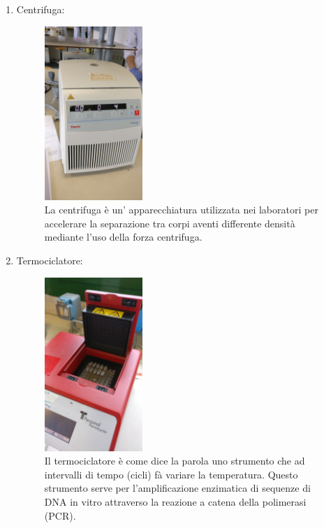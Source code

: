 \documentclass{article}
\begin{document}
\begin{enumerate}
		\vspace{0.5cm}


		\item Centrifuga:

		\begin{figure}[H]

			\includegraphics[width=0.35\textwidth]{./immagini/centrifuga.jpg}
			\caption{La centrifuga è un' apparecchiatura utilizzata nei laboratori per accelerare
			la separazione tra corpi aventi differente densità mediante l'uso della forza centrifuga.}
			\label{centrifuga}

		\end{figure}

		\vspace{0.5cm}


		\item Termociclatore:

		\begin{figure}[H]

			\includegraphics[width=0.35\textwidth]{./immagini/termociclatore.jpg}
			\caption{Il termociclatore è come dice la parola uno strumento
			che ad intervalli di tempo (cicli) fà variare la temperatura.
			Questo strumento serve per l'amplificazione enzimatica di sequenze di DNA in
			vitro attraverso la reazione a catena della polimerasi (PCR).}
			\label{termociclatore}


\end{figure}
\end{enumerate}
\end{document}
